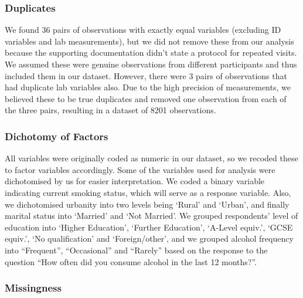 \documentclass[
  11pt,
  twocolumn]{article}
\begin{document}
\hypertarget{duplicates}{%
\subsubsection{Duplicates}\label{duplicates}}

We found 36 pairs of observations with exactly equal variables
(excluding ID variables and lab measurements), but we did not remove
these from our analysis because the supporting documentation didn't
state a protocol for repeated visits. We assumed these were genuine
observations from different participants and thus included them in our
dataset. However, there were 3 pairs of observations that had duplicate
lab variables also. Due to the high precision of measurements, we
believed these to be true duplicates and removed one observation from
each of the three pairs, resulting in a dataset of 8201 observations.

\hypertarget{dichotomy-of-factors}{%
\subsubsection{Dichotomy of Factors}\label{dichotomy-of-factors}}

All variables were originally coded as numeric in our dataset, so we
recoded these to factor variables accordingly. Some of the variables
used for analysis were dichotomised by us for easier interpretation. We
coded a binary variable indicating current smoking status, which will
serve as a response variable. Also, we dichotomised urbanity into two
levels being `Rural' and `Urban', and finally marital status into
`Married' and `Not Married'. We grouped respondents' level of education
into `Higher Education', `Further Education', `A-Level equiv.', `GCSE
equiv.', `No qualification' and `Foreign/other', and we grouped alcohol
frequency into ``Frequent'', ``Occasional'' and ``Rarely'' based on the
response to the question ``How often did you consume alcohol in the last
12 months?''.

\hypertarget{missingness}{%
\subsubsection{Missingness}\label{missingness}}
\end{document}
